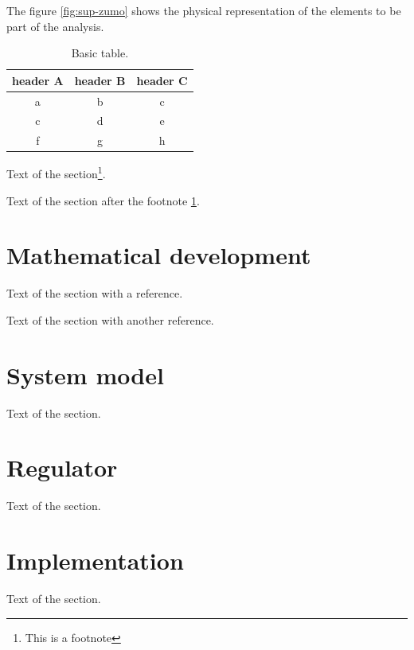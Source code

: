 \documentclass{article}
\begin{document}
The figure \ref{fig:sup-zumo} shows the physical representation of the elements to be part of the analysis.

\begin{table}[h!]
	\centering
	\caption{Basic table.}
	\label{tab:tab1}
	\begin{tabular}{ccc}

		\toprule

		header A & header B & header C\\

		\midrule

		a & b & c\\
		c & d & e\\
		f & g & h\\

		\bottomrule

	\end{tabular}
\end{table}

Text of the section\footnote{\label{fn1}This is a footnote}.

Text of the section after the footnote \ref{fn1}.

\section{Mathematical development}

Text of the section\cite{DOE17} with a reference.

Text of the section\cite{TYSON08} with another reference.

\section{System model}

Text of the section.

\section{Regulator}

Text of the section.

\section{Implementation}

Text of the section.

\begin{appendix}
	\newpage
	\listoffigures
	\newpage
	\listoftables
\end{appendix}

\newpage
\printbibliography
\end{document}

